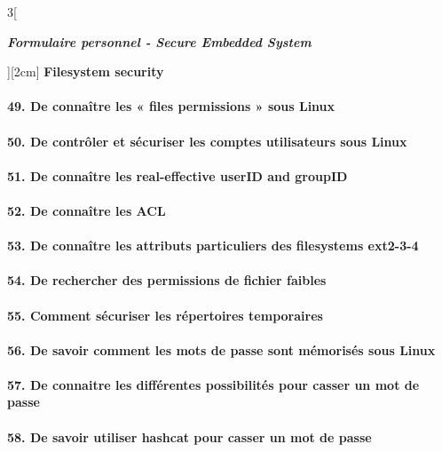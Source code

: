 \begin{multicols}{3}[\centerline{ \large\em \textbf{Formulaire personnel - Secure Embedded System}}][2cm]
{\Large \textbf{Filesystem security}}\\
\paragraph*{49. De connaître les « files permissions » sous Linux\\}
\paragraph*{50. De contrôler et sécuriser les comptes utilisateurs sous Linux\\}
\paragraph*{51. De connaître les real-effective userID and groupID\\}
\paragraph*{52. De connaître les ACL\\}
\paragraph*{53. De connaître les attributs particuliers des filesystems ext2-3-4\\}
\paragraph*{54. De rechercher des permissions de fichier faibles\\}
\paragraph*{55. Comment sécuriser les répertoires temporaires\\}
\paragraph*{56. De savoir comment les mots de passe sont mémorisés sous Linux\\}
\paragraph*{57. De connaitre les différentes possibilités pour casser un mot de passe\\}
\paragraph*{58. De savoir utiliser hashcat pour casser un mot de passe\\}
\begin{minipage}{\linewidth}
	\centering
\end{minipage}\\


\end{multicols}

